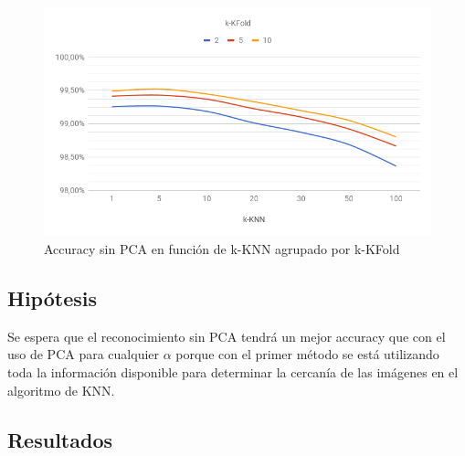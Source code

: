\begin{figure}[H]
	\centering
	\includegraphics[width=\textwidth]{graficos/cv1_sin_pca_accuracy.png}
	\caption{Accuracy sin PCA en función de k-KNN agrupado por k-KFold}
	\label{fig:cv1_sin_pca_accuracy}
\end{figure}

\subsection{Hipótesis}

Se espera que el reconocimiento sin PCA tendrá un mejor accuracy que con el uso de PCA para cualquier $\alpha$ porque con el primer método se está utilizando toda la información disponible para determinar la cercanía de las imágenes en el algoritmo de KNN.

\subsection{Resultados}